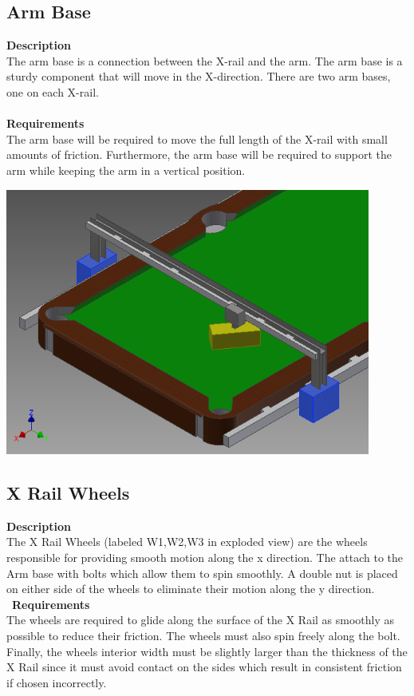 \documentclass[titlepage]{article}
\begin{document}
\subsection{Arm Base}
\textbf{Description}\\
The arm base is a connection between the X-rail and the arm. The arm base is a sturdy component that will move in the X-direction. There are two arm bases, one on each X-rail.\\~\\
\textbf{Requirements}\\
The arm base will be required to move the full length of the X-rail with small amounts of friction. Furthermore, the arm base will be required to support the arm while keeping the arm in a vertical position.
\begin{center}
	\includegraphics[width = 0.9\textwidth]{armBase.png}	%
\label{fig:armBaseFig}
\end{center}

\subsection{X Rail Wheels}
\textbf{Description}\\
The X Rail Wheels (labeled W1,W2,W3 in exploded view) are the wheels responsible for providing smooth motion along the x direction. The attach to the Arm base with bolts which allow them to spin smoothly. A double nut is placed on either side of the wheels to eliminate their motion along the y direction.\\\
\textbf{Requirements}\\
The wheels are required to glide along the surface of the X Rail as smoothly as possible to reduce their friction. The wheels must also spin freely along the bolt. Finally, the wheels interior width must be slightly larger than the thickness of the X Rail since it must avoid contact on the sides which result in consistent friction if chosen incorrectly.
\end{document}
